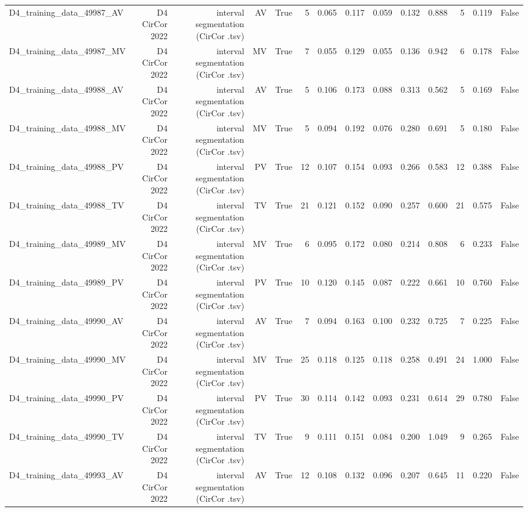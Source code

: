 \begin{table}[htbp]
\begin{tabular}{lrrrrrrrrrrrrr}
    D4\_training\_data\_49987\_AV & D4 CirCor 2022 & interval segmentation (CirCor .tsv) & AV & True & 5 & 0.065 & 0.117 & 0.059 & 0.132 & 0.888 & 5 & 0.119 & False \\
    D4\_training\_data\_49987\_MV & D4 CirCor 2022 & interval segmentation (CirCor .tsv) & MV & True & 7 & 0.055 & 0.129 & 0.055 & 0.136 & 0.942 & 6 & 0.178 & False \\
    D4\_training\_data\_49988\_AV & D4 CirCor 2022 & interval segmentation (CirCor .tsv) & AV & True & 5 & 0.106 & 0.173 & 0.088 & 0.313 & 0.562 & 5 & 0.169 & False \\
    D4\_training\_data\_49988\_MV & D4 CirCor 2022 & interval segmentation (CirCor .tsv) & MV & True & 5 & 0.094 & 0.192 & 0.076 & 0.280 & 0.691 & 5 & 0.180 & False \\
    D4\_training\_data\_49988\_PV & D4 CirCor 2022 & interval segmentation (CirCor .tsv) & PV & True & 12 & 0.107 & 0.154 & 0.093 & 0.266 & 0.583 & 12 & 0.388 & False \\
    D4\_training\_data\_49988\_TV & D4 CirCor 2022 & interval segmentation (CirCor .tsv) & TV & True & 21 & 0.121 & 0.152 & 0.090 & 0.257 & 0.600 & 21 & 0.575 & False \\
    D4\_training\_data\_49989\_MV & D4 CirCor 2022 & interval segmentation (CirCor .tsv) & MV & True & 6 & 0.095 & 0.172 & 0.080 & 0.214 & 0.808 & 6 & 0.233 & False \\
    D4\_training\_data\_49989\_PV & D4 CirCor 2022 & interval segmentation (CirCor .tsv) & PV & True & 10 & 0.120 & 0.145 & 0.087 & 0.222 & 0.661 & 10 & 0.760 & False \\
    D4\_training\_data\_49990\_AV & D4 CirCor 2022 & interval segmentation (CirCor .tsv) & AV & True & 7 & 0.094 & 0.163 & 0.100 & 0.232 & 0.725 & 7 & 0.225 & False \\
    D4\_training\_data\_49990\_MV & D4 CirCor 2022 & interval segmentation (CirCor .tsv) & MV & True & 25 & 0.118 & 0.125 & 0.118 & 0.258 & 0.491 & 24 & 1.000 & False \\
    D4\_training\_data\_49990\_PV & D4 CirCor 2022 & interval segmentation (CirCor .tsv) & PV & True & 30 & 0.114 & 0.142 & 0.093 & 0.231 & 0.614 & 29 & 0.780 & False \\
    D4\_training\_data\_49990\_TV & D4 CirCor 2022 & interval segmentation (CirCor .tsv) & TV & True & 9 & 0.111 & 0.151 & 0.084 & 0.200 & 1.049 & 9 & 0.265 & False \\
    D4\_training\_data\_49993\_AV & D4 CirCor 2022 & interval segmentation (CirCor .tsv) & AV & True & 12 & 0.108 & 0.132 & 0.096 & 0.207 & 0.645 & 11 & 0.220 & False \\

\end{tabular}
\end{table}
